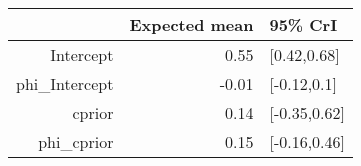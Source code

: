 \begin{tabular}{rrl}
  \hline
 & Expected mean & 95\% CrI \\ 
  \hline
Intercept & 0.55 & [0.42,0.68] \\ 
  phi\_Intercept & -0.01 & [-0.12,0.1] \\ 
  cprior & 0.14 & [-0.35,0.62] \\ 
  phi\_cprior & 0.15 & [-0.16,0.46] \\ 
   \hline
\end{tabular}

